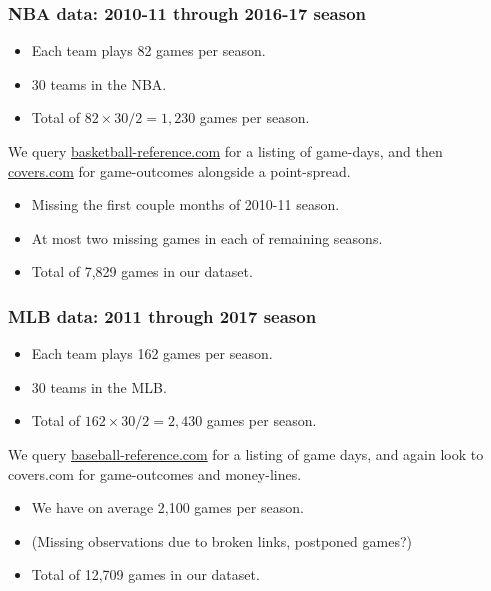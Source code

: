 \documentclass{beamer}
\begin{document}
\begin{frame}   \frametitle{NBA data: 2010-11 through 2016-17 season}
  \begin{itemize}     \item Each team plays 82 games per season.
    \item 30 teams in the NBA.
    \item Total of $82 \times 30 / 2 = 1,230$ games per season.  
  \end{itemize}

  \vspace{12pt}We query \href{http://www.basketball-reference.com/leagues/}{basketball-reference.com}
  for a listing of game-days, and then 
  \href{http://www.covers.com/sports/NBA/matchups?selectedDate=2011-1-01}{covers.com} for 
  game-outcomes alongside a point-spread.

  \vspace{12pt}  
  \begin{itemize}     \item Missing the first couple months of 2010-11 season.
    \item At most two missing games in each of remaining seasons.
    \item Total of 7,829 games in our dataset.   \end{itemize}
\end{frame}

\begin{frame}   \frametitle{MLB data: 2011 through 2017 season}
  \begin{itemize}     \item Each team plays 162 games per season.
    \item 30 teams in the MLB.
    \item Total of $162 \times 30 / 2 = 2,430$ games per season.   \end{itemize}
  
  \vspace{12pt}We query \href{http://www.baseball-reference.com/leagues/}{baseball-reference.com}
  for a listing of game days, and again look to covers.com for game-outcomes and money-lines.
  
  \vspace{12pt}
  \begin{itemize}     \item We have on average 2,100 games per season.
    \item (Missing observations due to broken links, postponed games?)
    \item Total of 12,709 games in our dataset.    \end{itemize} \end{frame}
\end{document}
